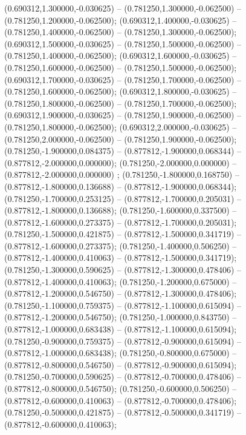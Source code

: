  (0.690312,1.300000,-0.030625) -- (0.781250,1.300000,-0.062500) -- (0.781250,1.200000,-0.062500);
 (0.690312,1.400000,-0.030625) -- (0.781250,1.400000,-0.062500) -- (0.781250,1.300000,-0.062500);
 (0.690312,1.500000,-0.030625) -- (0.781250,1.500000,-0.062500) -- (0.781250,1.400000,-0.062500);
 (0.690312,1.600000,-0.030625) -- (0.781250,1.600000,-0.062500) -- (0.781250,1.500000,-0.062500);
 (0.690312,1.700000,-0.030625) -- (0.781250,1.700000,-0.062500) -- (0.781250,1.600000,-0.062500);
 (0.690312,1.800000,-0.030625) -- (0.781250,1.800000,-0.062500) -- (0.781250,1.700000,-0.062500);
 (0.690312,1.900000,-0.030625) -- (0.781250,1.900000,-0.062500) -- (0.781250,1.800000,-0.062500);
 (0.690312,2.000000,-0.030625) -- (0.781250,2.000000,-0.062500) -- (0.781250,1.900000,-0.062500);
 (0.781250,-1.900000,0.084375) -- (0.877812,-1.900000,0.068344) -- (0.877812,-2.000000,0.000000);
 (0.781250,-2.000000,0.000000) -- (0.877812,-2.000000,0.000000) ;
 (0.781250,-1.800000,0.168750) -- (0.877812,-1.800000,0.136688) -- (0.877812,-1.900000,0.068344);
 (0.781250,-1.700000,0.253125) -- (0.877812,-1.700000,0.205031) -- (0.877812,-1.800000,0.136688);
 (0.781250,-1.600000,0.337500) -- (0.877812,-1.600000,0.273375) -- (0.877812,-1.700000,0.205031);
 (0.781250,-1.500000,0.421875) -- (0.877812,-1.500000,0.341719) -- (0.877812,-1.600000,0.273375);
 (0.781250,-1.400000,0.506250) -- (0.877812,-1.400000,0.410063) -- (0.877812,-1.500000,0.341719);
 (0.781250,-1.300000,0.590625) -- (0.877812,-1.300000,0.478406) -- (0.877812,-1.400000,0.410063);
 (0.781250,-1.200000,0.675000) -- (0.877812,-1.200000,0.546750) -- (0.877812,-1.300000,0.478406);
 (0.781250,-1.100000,0.759375) -- (0.877812,-1.100000,0.615094) -- (0.877812,-1.200000,0.546750);
 (0.781250,-1.000000,0.843750) -- (0.877812,-1.000000,0.683438) -- (0.877812,-1.100000,0.615094);
 (0.781250,-0.900000,0.759375) -- (0.877812,-0.900000,0.615094) -- (0.877812,-1.000000,0.683438);
 (0.781250,-0.800000,0.675000) -- (0.877812,-0.800000,0.546750) -- (0.877812,-0.900000,0.615094);
 (0.781250,-0.700000,0.590625) -- (0.877812,-0.700000,0.478406) -- (0.877812,-0.800000,0.546750);
 (0.781250,-0.600000,0.506250) -- (0.877812,-0.600000,0.410063) -- (0.877812,-0.700000,0.478406);
 (0.781250,-0.500000,0.421875) -- (0.877812,-0.500000,0.341719) -- (0.877812,-0.600000,0.410063);

